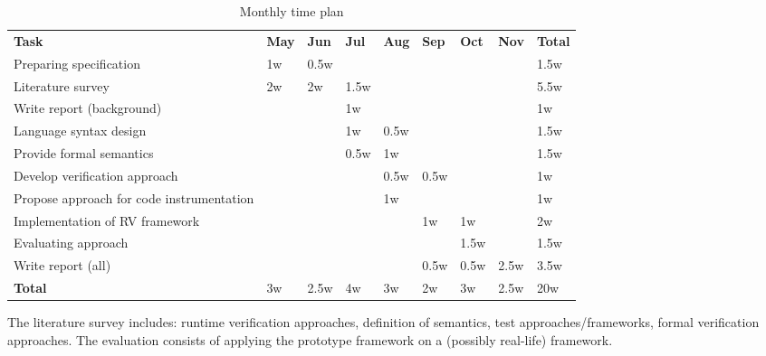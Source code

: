 \documentclass[a4paper,11pt]{article}
\begin{document}
\begin{center}
	\renewcommand{\arraystretch}{1.5}
	\begin{table}[h!b!p!]

	\begin{tabular}{ p{4cm} | l l l l l l l | l }
        \textbf{Task} & \textbf{May} & \textbf{Jun} & \textbf{Jul} &
        \textbf{Aug} & \textbf{Sep} & \textbf{Oct} & \textbf{Nov} &
        \textbf{Total} \\
		\noalign{\smallskip}\hline\noalign{\smallskip}

        Preparing specification &
        1w & 0.5w  & & & & & & 1.5w \\

        Literature survey &
        2w & 2w & 1.5w & & & & & 5.5w \\

        Write report (background) &
        & & 1w & & & & & 1w \\

        Language syntax design &
        & & 1w & 0.5w & & & & 1.5w \\

        Provide formal semantics &
        & & 0.5w & 1w & & & & 1.5w \\

        Develop verification approach &
        & & & 0.5w & 0.5w & & & 1w \\

        Propose approach for code instrumentation &
        & & & 1w & & & & 1w \\

        Implementation of RV framework &
        & & & & 1w & 1w & & 2w \\

        Evaluating approach &
        & & & & & 1.5w & & 1.5w \\

        Write report (all) &
        & & & & 0.5w & 0.5w & 2.5w & 3.5w \\

		\noalign{\smallskip}\hline\noalign{\smallskip}
        \textbf{Total} &
        3w & 2.5w & 4w & 3w & 2w & 3w & 2.5w & 20w \\

	\end{tabular}
	\caption{Monthly time plan}
	\end{table}
\end{center}

The literature survey includes: runtime verification approaches, definition of
semantics, test approaches/frameworks, formal verification approaches. The
evaluation consists of applying the prototype framework on a (possibly
real-life) framework.
\end{document}
